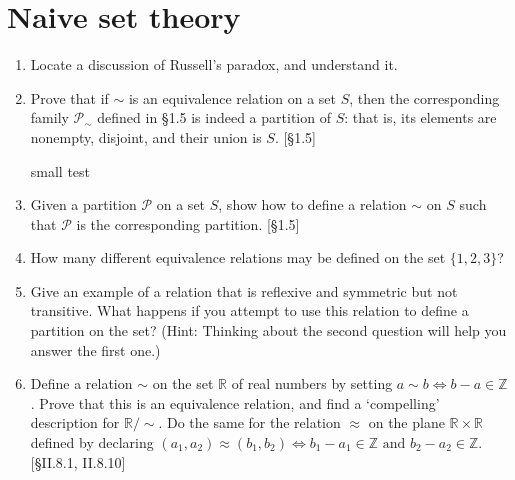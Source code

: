 \section{Naive set theory}
\begin{enumerate}
    \item Locate a discussion of Russell's paradox, and understand it.
    \item Prove that if $\sim$ is an equivalence relation on a set $S$, then the corresponding family $\mathcal{P}_{\sim}$ defined in \S1.5 is indeed a partition of $S$: that is, its elements are nonempty, disjoint, and their union is $S$. [\S1.5]

          \begin{solution}
            \lipsum[1]

            small test
          \end{solution}

    \item Given a partition $\mathcal{P}$ on a set $S$, show how to define a relation $\sim$ on $S$ such that $\mathcal{P}$ is the corresponding partition. [\S1.5]
    \item How many different equivalence relations may be defined on the set $\{1, 2, 3\}$?
    \item Give an example of a relation that is reflexive and symmetric but not transitive. What happens if you attempt to use this relation to define a partition on the set? (Hint: Thinking about the second question will help you answer the first one.)
    \item Define a relation $\sim$ on the set $\mathbb{R}$ of real numbers by setting $a \sim b \iff b-a \in \mathbb{Z}$. Prove that this is an equivalence relation, and find a `compelling' description for $\mathbb{R}/\sim$. Do the same for the relation $\approx$ on the plane $\mathbb{R} \times \mathbb{R}$ defined by declaring $(a_1, a_2) \approx (b_1, b_2) \iff b_1 - a_1 \in \mathbb{Z} \text{ and } b_2 - a_2 \in \mathbb{Z}$. [\S II.8.1, II.8.10]
\end{enumerate}

